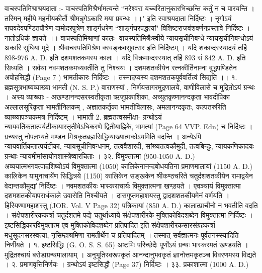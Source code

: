 वाचस्पतिमिश्राश्रयदाता :-
वाचस्पतिमिश्रैर्भामत्यन्ते ``नरेश्वरा यच्चरितानुकारभिच्छन्ति कर्तुं न च पारयन्ति । तस्मिन् महीये महनीयकीर्तौ श्रीमन्नृगेऽकारि मया प्रबन्धः ।।" इति स्वाश्रयदाता निर्दिष्टः । नृगोऽयं राघवदेवपण्डितपौत्रेण दामोदरपुत्रेण शार्ङ्गधरेण ``शार्ङ्गघरपद्धत्यां" विशिष्टराजवंशवर्णनप्रस्तावे निर्दिष्टः । नातोऽधिकं ज्ञायते ।।
वाचस्पतिमिश्राणां कालः-
वाचस्पतिमिश्रैःस्वीये न्यायसृचीनिबन्धे न्यायसृचीनिबन्धोऽयं अकारि सुधियां मुदे । श्रीवाचस्पतिमिश्रेण क्स्वङ्कवसुवत्सर इति निर्दिष्टम् । यदि शकाब्दस्स्यादयं तर्हि 898-976 A. D. इति दशमशतकमस्य कालः । यदि विक्रमाब्दस्स्यात् तर्हि 893 सं 842 A. D. इति  सिध्यति । सर्वथा नवमशतकमध्यवर्तीति तु निश्चयः । दशमशतकीयेन रत्नकीर्तिनाम्ना बुद्धपण्डितेन अपोहसिद्धौ (Page 7 ) भामतीकारः निर्दिष्टः । तस्मादप्यस्य दशमशतकपूर्ववर्तित्वं सिद्यति ।।
१. ब्रह्मसूत्रभाष्यव्याख्या भामती (N. S. P.)
वाराणस्यां , निर्णयसागरमुद्रणालये, वाणीविलासे च मुद्रितोऽयं ग्रन्थः । अस्य व्याख्याः - अखण्डानन्दसरस्वतीकृता ऋजुप्रकाशिका, अच्युतकृष्णानन्दकृता भावदीपिका अल्लालसूरिकृता भामतीनिलकम् , अज्ञातकर्तृका भामतीविलासः, अमलानन्दकृतः, कल्पतरुरिति व्याख्यापञ्चकमत्र निर्दिष्टम् ।
भामाती
2. ब्रह्मतत्वसमीक्षा-
ग्रन्थोऽयं न्यायवर्तिकतात्पर्यटीकायास्तृतीयेऽधिकरणे द्वितीयाह्निके, भामत्यां (Page 64 VVP. Edn) च निर्दिष्टः । ग्रन्थस्तु नोपलभ्यते मण्डन मिश्रकृतब्रह्मसिद्धिव्याख्यात्मकोऽयमिति वदन्ति ।
अन्येऽपि न्यायवार्तिकतात्पर्यटीका, न्यायसूचीनिवन्धनम्, तत्ववैशारदी, सांख्यतत्वकौमुदी, तत्वबिन्दुः, न्यायकणिकादयः ग्रन्थाः न्यायमीमांसायोगशास्त्रेष्वारचिताः ।
३२. विमुक्तात्मा (950-1050 A. D.)
अव्ययात्मभगवत्पादशिष्योऽयं विमुक्तात्मा (1050) कालिकेनानन्दबोधयतिना प्रमाणमालायां (1150 A. D.) कालिकेन यामुनाचार्येण सिद्धित्रये (1150) कालिकेन सङ्खकेन श्रीकण्ठचरिते चतुर्दशशतकीयेन रामाद्वयेन वेदान्तकौमुद्यां निर्दिष्टः । नवमशतकीयः भास्कराचार्यः विमुक्तात्मना खण्ड़यते । एवञ्चायं विमुक्तात्मा दशमशतकीयापरार्धकाले उवासेति निश्चीयते । दासगुप्तमहाशयस्तु द्वादशशतकीयमेनं वर्णयति । हिरियण्णामहाशस्तु (JOR. Vol. V Page 32) पत्रिकायां (850 A. D.) कालात्प्राचीनो न भवतीति वदति ।
संक्षेपशारीरककर्त्रा चतुर्दशतमे पद्ये चतुर्थाध्याये संक्षेपशारीरके मुक्तिकोविदशब्देन विमुक्तात्मा निर्दिष्टः । इष्टसिद्धिकारविमुक्तात्म एव मुक्तिकोविदशब्देन प्रतिपादित इति संक्षेपशारीरकसारसंग्रहकर्त्रा मधुसूदनसरस्वत्या, नृसिम्हाश्रमिणा रामतीर्थेन च प्रतिपादितम् । तस्मात् सर्वज्ञात्मनः पूर्वतनस्स्यादिति निर्णीयते ।
१. इष्टसिद्धिः (G. O. S. S. 65)
अष्टभिः परिच्छेदैः पूर्णोऽयं ग्रन्थः भास्करमतं खण्डयति । मुद्रितश्चायं बरोडाग्रन्थमालायाम् । अनुभूतिस्वरूपकृतं आनन्दानुभवकृतं ज्ञानोत्तमकृतञ्च विवरणमस्य विद्यते ।
२. प्रमाणवृत्तिनिर्णयः ।
ग्रन्थोऽयं इष्टसिद्धौ (Page 37) निर्दिष्टः ।
३३. प्रकाशात्मा (1000 A. D.)
